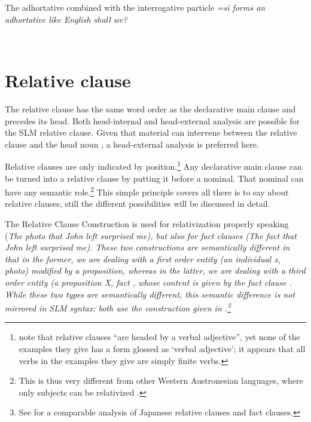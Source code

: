 The adhortative combined with the interrogative particle \em =si \em forms an adhortative like English \em shall we?\em


\\ 




\section{Relative clause}\label{sec:cls:Relativeclause}
The relative clause has the same word order as the declarative main clause and precedes its head. Both head-internal and head-external analysis are possible for the SLM relative clause. Given that material can intervene between the relative clause and the head noun , a head-external analysis is preferred here.


Relative clauses are only indicated by position.\footnote{\citet{SmithEtAl2004} note that relative clauses ``are headed by a verbal adjective'', yet none of the examples they give has a form glossed as `verbal adjective'; it appears that all verbs in the examples they give are simply finite verbs.} Any declarative main clause can be turned into a relative clause by putting it before a nominal. That nominal can have any semantic role.\footnote{This is thus very different from other Western Austronesian languages, where only subjects can be relativized \citep[161]{Himmelmann2005typochar}.} This simple principle covers all there is to say about relative clauses, still the different possibilities will be discussed in detail.

The Relative Clause Construction is used for relativization properly speaking (\em The photo that John left surprised me\em), but also for fact clauses (\em The fact that John left surprised me\em). These two constructions are semantically different in that in the former, we are dealing with a first order entity  (an individual x,  \em photo\em) modified by a proposition, whereas in the latter, we are dealing with a third order entity (a proposition X, \em fact \em \citep[8]{Hengeveld1992nvpttd}, whose content is given by the fact clause \citep[cf.][46]{Lehmann1984}. While these two types are semantically different, this semantic difference is not mirrored in SLM syntax: both use the construction given in .\footnote{See \citet{Matsumoto1997} for a comparable analysis of Japanese relative clauses and fact clauses.}

